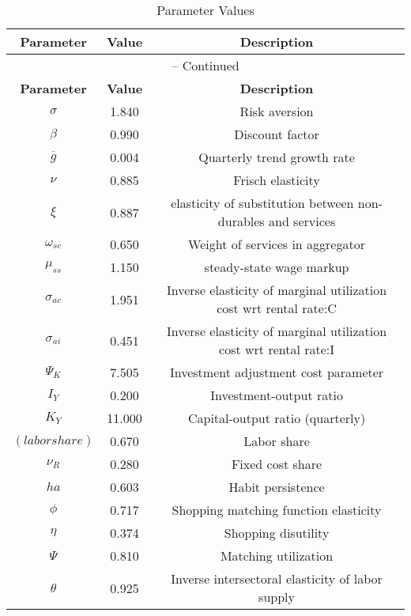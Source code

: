 \begin{center}
\begin{longtable}{ccc}
\caption{Parameter Values}\\%
\toprule%
\multicolumn{1}{c}{\textbf{Parameter}} &
\multicolumn{1}{c}{\textbf{Value}} &
 \multicolumn{1}{c}{\textbf{Description}}\\%
\midrule%
\endfirsthead
\multicolumn{3}{c}{{\tablename} \thetable{} -- Continued}\\%
\midrule%
\multicolumn{1}{c}{\textbf{Parameter}} &
\multicolumn{1}{c}{\textbf{Value}} &
  \multicolumn{1}{c}{\textbf{Description}}\\%
\midrule%
\endhead
${\sigma}$ 	 & 	 1.840 	 & 	 Risk aversion\\
${\beta}$ 	 & 	 0.990 	 & 	 Discount factor\\
${\overline{g}}$ 	 & 	 0.004 	 & 	 Quarterly trend growth rate\\
$\nu$ 	 & 	 0.885 	 & 	 Frisch elasticity\\
$\xi$ 	 & 	 0.887 	 & 	 elasticity of substitution between non-durables and services\\
$\omega_{sc}$ 	 & 	 0.650 	 & 	 Weight of services in aggregator\\
$\mu_{ss}$ 	 & 	 1.150 	 & 	 steady-state wage markup\\
${\sigma_{ac}}$ 	 & 	 1.951 	 & 	 Inverse elasticity of marginal utilization cost wrt rental rate:C\\
${\sigma_{ai}}$ 	 & 	 0.451 	 & 	 Inverse elasticity of marginal utilization cost wrt rental rate:I\\
${\Psi_{K}}$ 	 & 	 7.505 	 & 	 Investment adjustment cost parameter\\
${I_Y}$ 	 & 	 0.200 	 & 	 Investment-output ratio\\
${K_Y}$ 	 & 	 11.000 	 & 	 Capital-output ratio (quarterly)\\
$(labor share)$ 	 & 	 0.670 	 & 	 Labor share\\
${\nu_R}$ 	 & 	 0.280 	 & 	 Fixed cost share\\
${ha}$ 	 & 	 0.603 	 & 	 Habit persistence\\
${\phi}$ 	 & 	 0.717 	 & 	 Shopping matching function elasticity\\
${\eta}$ 	 & 	 0.374 	 & 	 Shopping disutility\\
${\Psi}$ 	 & 	 0.810 	 & 	 Matching utilization\\
${\theta}$ 	 & 	 0.925 	 & 	 Inverse intersectoral elasticity of labor supply\\

\end{longtable}
\end{center}
